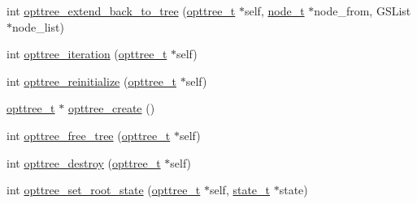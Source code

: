 \begin{DoxyCompactItemize}
\item 
int \hyperlink{a00019_a5693c6e43fd9b41afba070ed16bbbcf6_a5693c6e43fd9b41afba070ed16bbbcf6}{opttree\-\_\-extend\-\_\-back\-\_\-to\-\_\-tree} (\hyperlink{a00020_a07b75293fafb6f31b7e9f723848ad105_a07b75293fafb6f31b7e9f723848ad105}{opttree\-\_\-t} $\ast$self, \hyperlink{a00020_a9c3f304c1ae0687240efd69b7dc98cd6_a9c3f304c1ae0687240efd69b7dc98cd6}{node\-\_\-t} $\ast$node\-\_\-from, \-G\-S\-List $\ast$node\-\_\-list)
\item 
int \hyperlink{a00019_a555d69f9356c39303401f79b5e3c02b8_a555d69f9356c39303401f79b5e3c02b8}{opttree\-\_\-iteration} (\hyperlink{a00020_a07b75293fafb6f31b7e9f723848ad105_a07b75293fafb6f31b7e9f723848ad105}{opttree\-\_\-t} $\ast$self)
\item 
int \hyperlink{a00019_a1a94286b5107f470ea340b615cc1e11c_a1a94286b5107f470ea340b615cc1e11c}{opttree\-\_\-reinitialize} (\hyperlink{a00020_a07b75293fafb6f31b7e9f723848ad105_a07b75293fafb6f31b7e9f723848ad105}{opttree\-\_\-t} $\ast$self)
\item 
\hyperlink{a00020_a07b75293fafb6f31b7e9f723848ad105_a07b75293fafb6f31b7e9f723848ad105}{opttree\-\_\-t} $\ast$ \hyperlink{a00019_a9477fb49d51f94d64301104b66f6f193_a9477fb49d51f94d64301104b66f6f193}{opttree\-\_\-create} ()
\item 
int \hyperlink{a00019_a0870ad0ef3b9b2f3ada62a352430f4b1_a0870ad0ef3b9b2f3ada62a352430f4b1}{opttree\-\_\-free\-\_\-tree} (\hyperlink{a00020_a07b75293fafb6f31b7e9f723848ad105_a07b75293fafb6f31b7e9f723848ad105}{opttree\-\_\-t} $\ast$self)
\item 
int \hyperlink{a00019_a87bc01b7917d322ff2ee448bb4055557_a87bc01b7917d322ff2ee448bb4055557}{opttree\-\_\-destroy} (\hyperlink{a00020_a07b75293fafb6f31b7e9f723848ad105_a07b75293fafb6f31b7e9f723848ad105}{opttree\-\_\-t} $\ast$self)
\item 
int \hyperlink{a00019_a7e5472ef1473797978ce8216b345b7fa_a7e5472ef1473797978ce8216b345b7fa}{opttree\-\_\-set\-\_\-root\-\_\-state} (\hyperlink{a00020_a07b75293fafb6f31b7e9f723848ad105_a07b75293fafb6f31b7e9f723848ad105}{opttree\-\_\-t} $\ast$self, \hyperlink{a00018_a1c9d0bb39483d4981491e6383b0dbb47_a1c9d0bb39483d4981491e6383b0dbb47}{state\-\_\-t} $\ast$state)
\end{DoxyCompactItemize}


